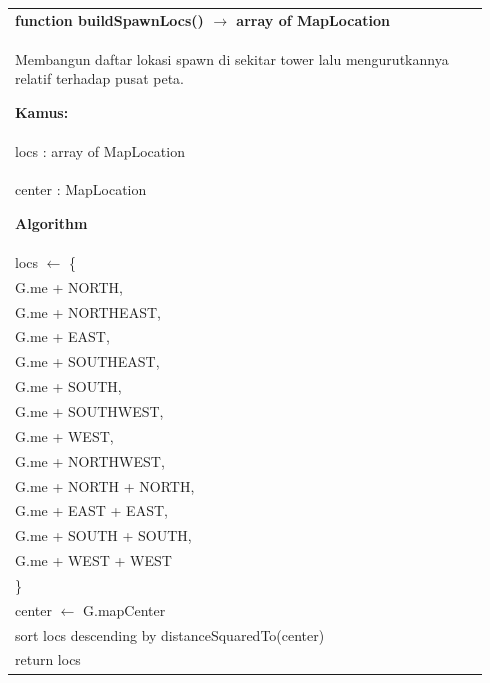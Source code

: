\documentclass{article}
\newenvironment{pseudobox}
{
\centering
\begin{longtable}{|p{0.94\linewidth}|}
\hline
}
{
\\ \hline
\end{longtable}
\vspace{0.05cm}
}
\begin{document}
\begin{pseudobox}
\textbf{function buildSpawnLocs() $\rightarrow$ array of MapLocation} \\
{ Membangun daftar lokasi spawn di sekitar tower lalu mengurutkannya relatif terhadap pusat peta. }

\textbf{Kamus:} \\
\hspace*{1em} locs : array of MapLocation \\
\hspace*{1em} center : MapLocation

\textbf{Algorithm} \\
\hspace*{1em} locs $\leftarrow$ \{ \\
\hspace*{2em} G.me + NORTH, \\
\hspace*{2em} G.me + NORTHEAST, \\
\hspace*{2em} G.me + EAST, \\
\hspace*{2em} G.me + SOUTHEAST, \\
\hspace*{2em} G.me + SOUTH, \\
\hspace*{2em} G.me + SOUTHWEST, \\
\hspace*{2em} G.me + WEST, \\
\hspace*{2em} G.me + NORTHWEST, \\
\hspace*{2em} G.me + NORTH + NORTH, \\
\hspace*{2em} G.me + EAST + EAST, \\
\hspace*{2em} G.me + SOUTH + SOUTH, \\
\hspace*{2em} G.me + WEST + WEST \\
\hspace*{1em} \} \\

\hspace*{1em} center $\leftarrow$ G.mapCenter \\
\hspace*{1em} sort locs descending by distanceSquaredTo(center) \\

\hspace*{1em} return locs
\end{pseudobox}
\end{document}
